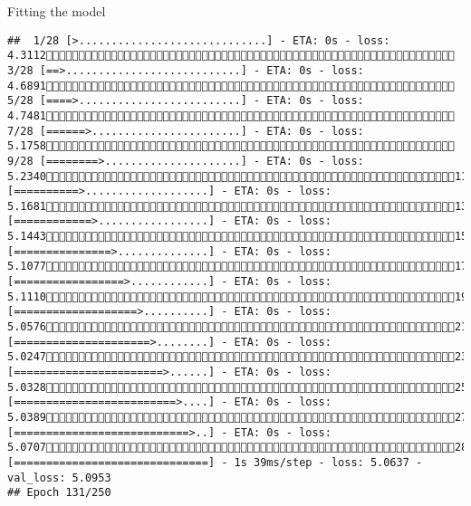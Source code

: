 \documentclass[
  ignorenonframetext,
]{beamer}
\begin{document}
\begin{frame}[fragile]{Fitting the model}
\begin{verbatim}
##  1/28 [>.............................] - ETA: 0s - loss: 4.3112 3/28 [==>...........................] - ETA: 0s - loss: 4.6891 5/28 [====>.........................] - ETA: 0s - loss: 4.7481 7/28 [======>.......................] - ETA: 0s - loss: 5.1758 9/28 [========>.....................] - ETA: 0s - loss: 5.234011/28 [==========>...................] - ETA: 0s - loss: 5.168113/28 [============>.................] - ETA: 0s - loss: 5.144315/28 [===============>..............] - ETA: 0s - loss: 5.107717/28 [=================>............] - ETA: 0s - loss: 5.111019/28 [===================>..........] - ETA: 0s - loss: 5.057621/28 [=====================>........] - ETA: 0s - loss: 5.024723/28 [=======================>......] - ETA: 0s - loss: 5.032825/28 [=========================>....] - ETA: 0s - loss: 5.038927/28 [===========================>..] - ETA: 0s - loss: 5.070728/28 [==============================] - 1s 39ms/step - loss: 5.0637 - val_loss: 5.0953
## Epoch 131/250

\end{verbatim}
\end{frame}
\end{document}
